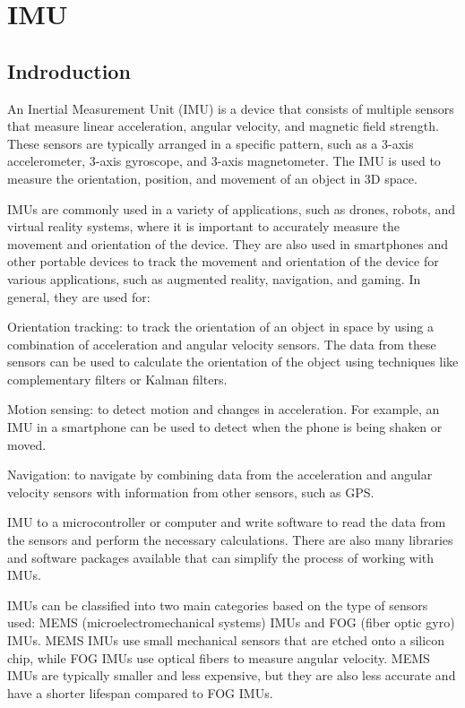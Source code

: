 \chapter{IMU}

\section{Indroduction}

An Inertial Measurement Unit (IMU) is a device that consists of multiple sensors that measure linear acceleration, angular velocity, and magnetic field strength. These sensors are typically arranged in a specific pattern, such as a 3-axis accelerometer, 3-axis gyroscope, and 3-axis magnetometer. The IMU is used to measure the orientation, position, and movement of an object in 3D space.

IMUs are commonly used in a variety of applications, such as drones, robots, and virtual reality systems, where it is important to accurately measure the movement and orientation of the device. They are also used in smartphones and other portable devices to track the movement and orientation of the device for various applications, such as augmented reality, navigation, and gaming.
In general, they are used for: 

Orientation tracking:  to track the orientation of an object in space by using a combination of acceleration and angular velocity sensors. The data from these sensors can be used to calculate the orientation of the object using techniques like complementary filters or Kalman filters.

Motion sensing:  to detect motion and changes in acceleration. For example, an IMU in a smartphone can be used to detect when the phone is being shaken or moved.

Navigation: to navigate by combining data from the acceleration and angular velocity sensors with information from other sensors, such as GPS. 

IMU to a microcontroller or computer and write software to read the data from the sensors and perform the necessary calculations. There are also many libraries and software packages available that can simplify the process of working with IMUs.

IMUs can be classified into two main categories based on the type of sensors used: MEMS (microelectromechanical systems) IMUs and FOG (fiber optic gyro) IMUs. MEMS IMUs use small mechanical sensors that are etched onto a silicon chip, while FOG IMUs use optical fibers to measure angular velocity. MEMS IMUs are typically smaller and less expensive, but they are also less accurate and have a shorter lifespan compared to FOG IMUs.

